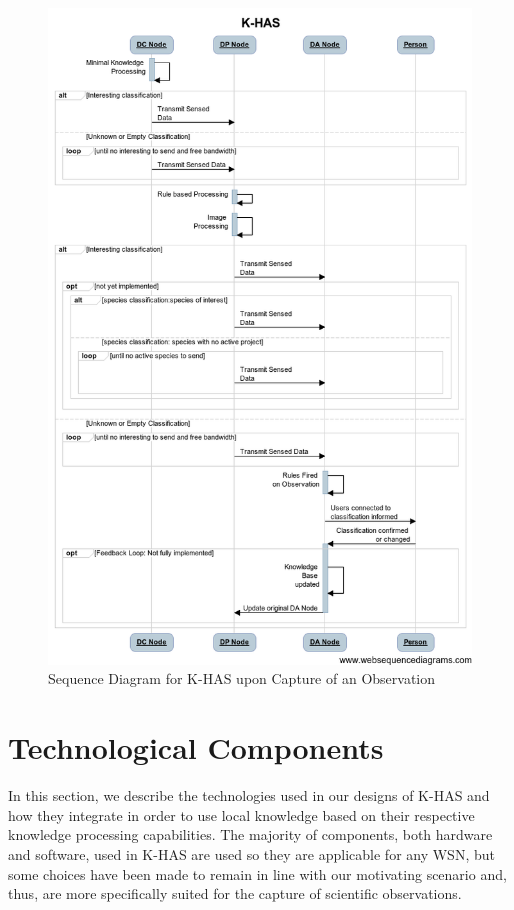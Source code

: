 	\begin{figure}
    \centering
      \includegraphics[width=\textwidth]{Chap4/figures/sd.png}
    \caption{Sequence Diagram for K-HAS upon Capture of an Observation}
    \label{arch:seq}
    \end{figure}
	
	\section{Technological Components}\label{arch:tech}
	In this section, we describe the technologies used in our designs of K-HAS and how they integrate in order to use local knowledge based on their respective knowledge processing capabilities. The majority of components, both hardware and software, used in K-HAS are used so they are applicable for any WSN, but some choices have been made to remain in line with our motivating scenario and, thus, are more specifically suited for the capture of scientific observations.
	
